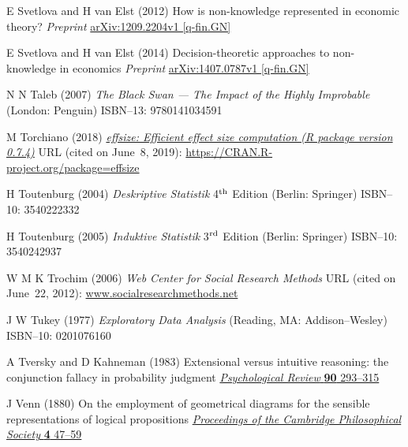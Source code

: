 \begin{thebibliography}{99}
E Svetlova and H van Elst
(2012) How is non-knowledge represented in economic theory?
\textit{Preprint} 
\href{http://arxiv.org/abs/1209.2204}{arXiv:1209.2204v1 [q-fin.GN]}

E Svetlova and H van Elst
(2014) Decision-theoretic approaches to non-knowledge in economics
\textit{Preprint} 
\href{http://arxiv.org/abs/1407.0787}{arXiv:1407.0787v1 [q-fin.GN]}

N N Taleb
(2007) \textit{The Black Swan --- The Impact of the Highly
Improbable} (London: Penguin)
ISBN--13: 9780141034591

M Torchiano
(2018) \href{https://doi.org/10.5281/zenodo.1480624}{\textit{effsize:
Efficient effect size computation (R package version 0.7.4)}}
URL (cited on June~8, 2019): 
\href{https://CRAN.R-project.org/package=effsize}{https://CRAN.R-project.org/package=effsize}

H Toutenburg
(2004) \textit{Deskriptive Statistik}
4$^{\rm th}$ Edition (Berlin: Springer) ISBN--10: 3540222332

H Toutenburg
(2005) \textit{Induktive Statistik}
3$^{\rm rd}$ Edition (Berlin: Springer) ISBN--10: 3540242937


W M K Trochim
(2006) \textit{Web Center for Social Research Methods} URL (cited
on June~22, 2012): \href{http://www.socialresearchmethods.net/}{www.socialresearchmethods.net}

J W Tukey
(1977) \textit{Exploratory Data Analysis}
(Reading, MA: Addison--Wesley)
ISBN--10: 0201076160

A Tversky and D Kahneman
(1983) Extensional versus intuitive reasoning: the conjunction 
fallacy in probability judgment
\href{http://dx.doi.org/10.1037/0033-295X.90.4.293}{\textit{Psychological Review} \textbf{90} 293--315}

J Venn
(1880) On the employment of geometrical diagrams for the sensible 
representations of logical propositions
\href{https://archive.org/stream/proceedingsofcam4188083camb#page/47/mode/1up}{\textit{Proceedings of the Cambridge Philosophical 
Society} \textbf{4} 47--59}


\end{thebibliography}
